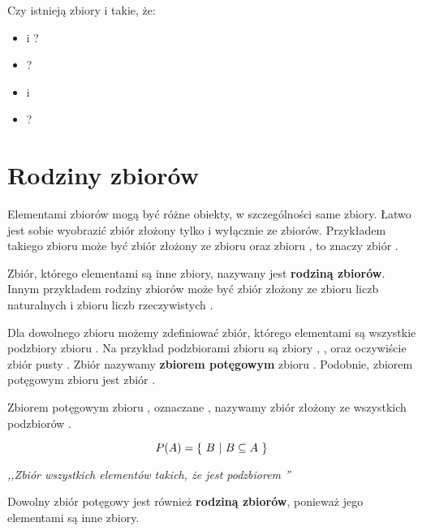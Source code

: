 \begin{ex}
Czy istnieją zbiory  i  takie, że:

\begin{itemize}
    \item {} i ?
    \item {}?
    \item {} i 
    \item {}?
\end{itemize}
\end{ex}

\section{Rodziny zbiorów}
Elementami zbiorów mogą być różne obiekty, w szczególności same zbiory. Łatwo jest sobie wyobrazić zbiór złożony tylko i wyłącznie ze zbiorów. Przykładem takiego zbioru może być zbiór złożony ze zbioru  oraz zbioru , to znaczy zbiór .

Zbiór, którego elementami są inne zbiory, nazywany jest \textbf{rodziną zbiorów}. Innym przykładem rodziny zbiorów może być zbiór złożony ze zbioru liczb naturalnych i zbioru liczb rzeczywistych .

Dla dowolnego zbioru  możemy zdefiniować zbiór, którego elementami są wszystkie podzbiory zbioru . Na przykład podzbiorami zbioru  są zbiory , ,  oraz oczywiście zbiór pusty \m{\emptyset}. Zbiór  nazywamy \textbf{zbiorem potęgowym} zbioru . Podobnie, zbiorem potęgowym zbioru  jest zbiór .

\begin{definition}
Zbiorem potęgowym zbioru , oznaczane , nazywamy zbiór złożony ze wszystkich podzbiorów .

\[
P(A) = \{\ B\ |\ B \subseteq A\ \}
\]
\begin{center}
    \textit{,,Zbiór wszystkich elementów  takich, że  jest podzbiorem ''}
\end{center}
\end{definition}

Dowolny zbiór potęgowy jest również \textbf{rodziną zbiorów}, ponieważ jego elementami są inne zbiory.


